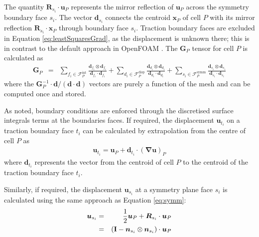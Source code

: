 \documentclass[sn-mathphys,Numbered]{sn-jnl}%
\newcommand{\bb}{\boldsymbol}
\begin{document}
The quantity $\bb{R}_{s_i} \cdot \bb{u}_P$ represents the mirror reflection of $\bb{u}_P$ across the symmetry boundary face $s_i$.
The vector $\bb{d}_{s_i}$ connects the centroid $\bb{x}_P$ of cell $P$ with its mirror reflection $\bb{R}_{s_i}  \cdot \bb{x}_P$ through boundary face $s_i$.
Traction boundary faces are excluded in Equation \ref{eq:leastSquaresGrad}, as the displacement is unknown there; this is in contrast to the default approach in OpenFOAM \citep{Jasak2011}.
The $\bb{G}_P$ tensor for cell $P$ is calculated as
\begin{eqnarray}
	 \bb{G}_P &=&
	 \sum_{{f_i} \in \mathcal{F}^{\text{int}}_P} \frac{\bb{d}_{f_i} \otimes \bb{d}_{f_i}}{\bb{d}_{f_i} \cdot \bb{d}_{f_i}}
	 +  \sum_{{d_i} \in \mathcal{F}^{\text{disp}}_P} \frac{\bb{d}_{d_i} \otimes \bb{d}_{d_i}}{\bb{d}_{d_i} \cdot \bb{d}_{d_i}}
	 +  \sum_{{s_i} \in \mathcal{F}^{\text{symm}}_P} \frac{\bb{d}_{s_i} \otimes \bb{d}_{s_i}}{\bb{d}_{s_i} \cdot \bb{d}_{s_i}}
\end{eqnarray}
where the $\bb{G}^{-1}_P \cdot \bb{d}/(\bb{d}\cdot \bb{d})$ vectors are purely a function of the mesh and can be computed once and stored.

As noted, boundary conditions are enforced through the discretised surface integrals terms at the boundaries faces. %
If required, the displacement $\bb{u}_{t_i}$ on a traction boundary face $t_i$ can be calculated by extrapolation from the centre of cell $P$ as
\begin{eqnarray}
	\bb{u}_{t_i} = \bb{u}_P + \bb{d}_{t_i} \cdot \left(\bb{\nabla} \bb{u} \right)_P
\end{eqnarray}
where $\bb{d}_{t_i}$ represents the vector from the centroid of cell $P$ to the centroid of the traction boundary face $t_i$.

Similarly, if required, the displacement $\bb{u}_{s_i}$ at a symmetry plane face $s_i$ is calculated using the same approach as Equation \ref{eq:symm}:
\begin{eqnarray} 
	\bb{u}_{s_i}
		&=&  \frac{1}{2} \bb{u}_P + \bb{R}_{s_i} \cdot \bb{u}_P \notag \\
		&=& \left (\textbf{I} - \bb{n}_{s_i} \otimes \bb{n}_{s_i} \right) \cdot \bb{u}_P
\end{eqnarray}
\end{document}
